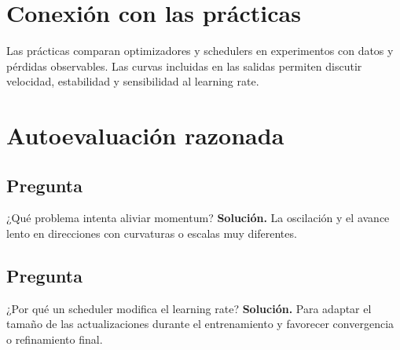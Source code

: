 \section{Conexión con las prácticas}

Las prácticas comparan optimizadores y schedulers en experimentos con datos y pérdidas observables. Las curvas incluidas en las salidas permiten discutir velocidad, estabilidad y sensibilidad al learning rate.


\section{Autoevaluación razonada}

\subsection*{Pregunta} ¿Qué problema intenta aliviar momentum?
\textbf{Solución.} La oscilación y el avance lento en direcciones con curvaturas o escalas muy diferentes.

\subsection*{Pregunta} ¿Por qué un scheduler modifica el learning rate?
\textbf{Solución.} Para adaptar el tamaño de las actualizaciones durante el entrenamiento y favorecer convergencia o refinamiento final.

